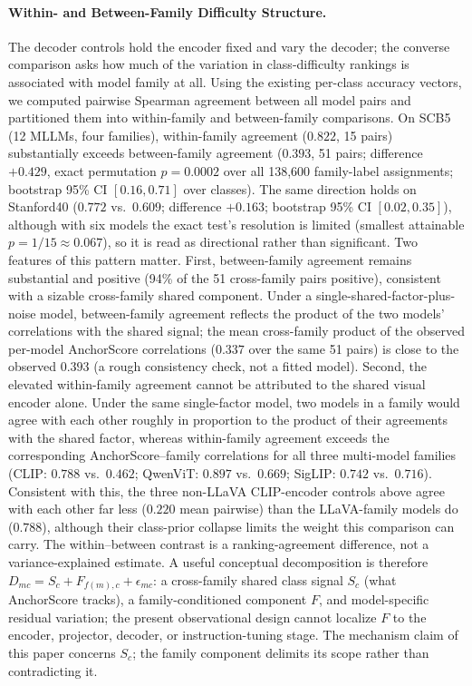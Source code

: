 \documentclass[a4paper,fleqn]{cas-sc}
\begin{document}
\paragraph{Within- and Between-Family Difficulty Structure.}
The decoder controls hold the encoder fixed and vary the decoder; the converse comparison asks how much of the variation in class-difficulty rankings is associated with model family at all. Using the existing per-class accuracy vectors, we computed pairwise Spearman agreement between all model pairs and partitioned them into within-family and between-family comparisons. On SCB5 (12 MLLMs, four families), within-family agreement ($0.822$, 15 pairs) substantially exceeds between-family agreement ($0.393$, 51 pairs; difference $+0.429$, exact permutation $p=0.0002$ over all 138{,}600 family-label assignments; bootstrap 95\% CI $[0.16, 0.71]$ over classes). The same direction holds on Stanford40 ($0.772$ vs.\ $0.609$; difference $+0.163$; bootstrap 95\% CI $[0.02, 0.35]$), although with six models the exact test's resolution is limited (smallest attainable $p = 1/15 \approx 0.067$), so it is read as directional rather than significant. Two features of this pattern matter. First, between-family agreement remains substantial and positive (94\% of the 51 cross-family pairs positive), consistent with a sizable cross-family shared component. Under a single-shared-factor-plus-noise model, between-family agreement reflects the product of the two models' correlations with the shared signal; the mean cross-family product of the observed per-model AnchorScore correlations ($0.337$ over the same 51 pairs) is close to the observed $0.393$ (a rough consistency check, not a fitted model). Second, the elevated within-family agreement cannot be attributed to the shared visual encoder alone. Under the same single-factor model, two models in a family would agree with each other roughly in proportion to the product of their agreements with the shared factor, whereas within-family agreement exceeds the corresponding AnchorScore--family correlations for all three multi-model families (CLIP: $0.788$ vs.\ $0.462$; QwenViT: $0.897$ vs.\ $0.669$; SigLIP: $0.742$ vs.\ $0.716$). Consistent with this, the three non-LLaVA CLIP-encoder controls above agree with each other far less ($0.220$ mean pairwise) than the LLaVA-family models do ($0.788$), although their class-prior collapse limits the weight this comparison can carry. The within--between contrast is a ranking-agreement difference, not a variance-explained estimate. A useful conceptual decomposition is therefore $D_{mc} = S_c + F_{f(m),c} + \epsilon_{mc}$: a cross-family shared class signal $S_c$ (what AnchorScore tracks), a family-conditioned component $F$, and model-specific residual variation; the present observational design cannot localize $F$ to the encoder, projector, decoder, or instruction-tuning stage. The mechanism claim of this paper concerns $S_c$; the family component delimits its scope rather than contradicting it.
\end{document}
